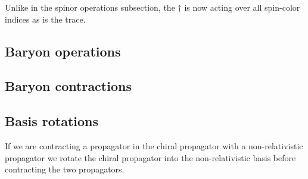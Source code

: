 Unlike in the spinor operations subsection, the $\dagger$ is
now acting over all spin-color indices as is the trace.

\subsection{Baryon operations}


\subsection{Baryon contractions}


\subsection{Basis rotations}

If we are contracting a propagator in the chiral propagator
with a non-relativistic propagator we rotate the chiral
propagator into the non-relativistic basis before contracting
the two propagators.


